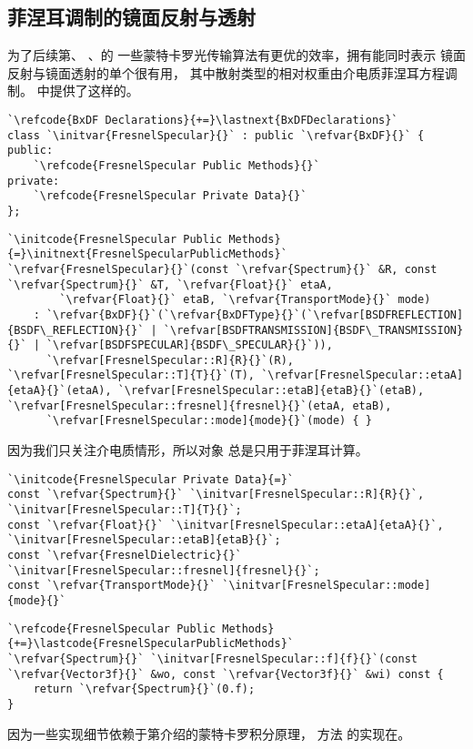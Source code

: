 \subsection{菲涅耳调制的镜面反射与透射}\label{sub:菲涅耳调制的镜面反射与透射}
为了后续第、
、的
一些蒙特卡罗光传输算法有更优的效率，拥有能同时表示
镜面反射与镜面透射的单个很有用，
其中散射类型的相对权重由介电质菲涅耳方程调制。
中提供了这样的。
\begin{lstlisting}
`\refcode{BxDF Declarations}{+=}\lastnext{BxDFDeclarations}`
class `\initvar{FresnelSpecular}{}` : public `\refvar{BxDF}{}` {
public:
    `\refcode{FresnelSpecular Public Methods}{}`
private:
    `\refcode{FresnelSpecular Private Data}{}`
};
\end{lstlisting}
\begin{lstlisting}
`\initcode{FresnelSpecular Public Methods}{=}\initnext{FresnelSpecularPublicMethods}`
`\refvar{FresnelSpecular}{}`(const `\refvar{Spectrum}{}` &R, const `\refvar{Spectrum}{}` &T, `\refvar{Float}{}` etaA,
        `\refvar{Float}{}` etaB, `\refvar{TransportMode}{}` mode) 
    : `\refvar{BxDF}{}`(`\refvar{BxDFType}{}`(`\refvar[BSDFREFLECTION]{BSDF\_REFLECTION}{}` | `\refvar[BSDFTRANSMISSION]{BSDF\_TRANSMISSION}{}` | `\refvar[BSDFSPECULAR]{BSDF\_SPECULAR}{}`)),
      `\refvar[FresnelSpecular::R]{R}{}`(R), `\refvar[FresnelSpecular::T]{T}{}`(T), `\refvar[FresnelSpecular::etaA]{etaA}{}`(etaA), `\refvar[FresnelSpecular::etaB]{etaB}{}`(etaB), `\refvar[FresnelSpecular::fresnel]{fresnel}{}`(etaA, etaB),
      `\refvar[FresnelSpecular::mode]{mode}{}`(mode) { }
\end{lstlisting}

因为我们只关注介电质情形，所以对象
总是只用于菲涅耳计算。

\begin{lstlisting}
`\initcode{FresnelSpecular Private Data}{=}`
const `\refvar{Spectrum}{}` `\initvar[FresnelSpecular::R]{R}{}`, `\initvar[FresnelSpecular::T]{T}{}`;
const `\refvar{Float}{}` `\initvar[FresnelSpecular::etaA]{etaA}{}`, `\initvar[FresnelSpecular::etaB]{etaB}{}`;
const `\refvar{FresnelDielectric}{}` `\initvar[FresnelSpecular::fresnel]{fresnel}{}`;
const `\refvar{TransportMode}{}` `\initvar[FresnelSpecular::mode]{mode}{}`
\end{lstlisting}
\begin{lstlisting}
`\refcode{FresnelSpecular Public Methods}{+=}\lastcode{FresnelSpecularPublicMethods}`
`\refvar{Spectrum}{}` `\initvar[FresnelSpecular::f]{f}{}`(const `\refvar{Vector3f}{}` &wo, const `\refvar{Vector3f}{}` &wi) const { 
    return `\refvar{Spectrum}{}`(0.f); 
}
\end{lstlisting}

因为一些实现细节依赖于第介绍的蒙特卡罗积分原理，
方法
的实现在。